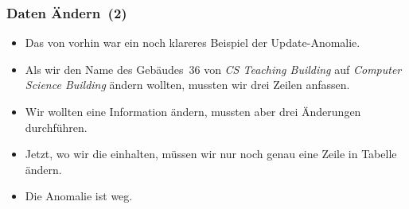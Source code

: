 \documentclass[aspectratio=169,mathserif,notheorems]{beamer}%
\begin{document}
%
%
\begin{frame}[t]%
\frametitle{Daten Ändern~(2)}%
\parbox{0.435\linewidth}{\small%
\begin{itemize}%
%
\item Das  von vorhin war ein noch klareres Beispiel der Update-Anomalie.%
%
\item<2-> Als wir den Name des Gebäudes~36 von \emph{CS Teaching Building} auf \emph{Computer Science Building} ändern wollten, mussten wir drei Zeilen anfassen.%
%
\item<3-> Wir wollten eine Information ändern, mussten aber drei Änderungen durchführen.%
%
\item<4-> Jetzt, wo wir die  einhalten, müssen wir nur noch genau eine Zeile in Tabelle  ändern.%
%
\item<5-> Die Anomalie ist weg.%
%
\end{itemize}%
}%
%
%
%
%
\end{frame}%
%
\end{document}
